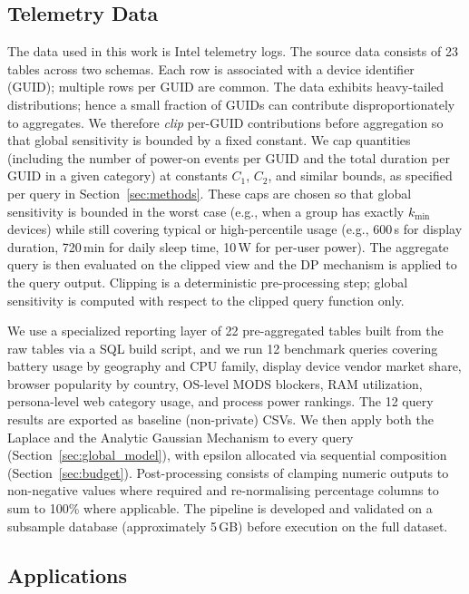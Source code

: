 \documentclass[12pt,letterpaper]{article}
\begin{document}
\subsection{Telemetry Data}
\label{sec:telemetry_data}

The data used in this work is Intel telemetry logs. The source data consists of 23 tables across two schemas. Each row is associated with a device identifier (GUID); multiple rows per GUID are common. The data exhibits heavy-tailed distributions; hence a small fraction of GUIDs can contribute disproportionately to aggregates. We therefore \emph{clip} per-GUID contributions before aggregation so that global sensitivity is bounded by a fixed constant. We cap quantities (including the number of power-on events per GUID and the total duration per GUID in a given category) at constants $C_1$, $C_2$, and similar bounds, as specified per query in Section~\ref{sec:methods}. These caps are chosen so that global sensitivity is bounded in the worst case (e.g., when a group has exactly $k_{\min}$ devices) while still covering typical or high-percentile usage (e.g., 600\,s for display duration, 720\,min for daily sleep time, 10\,W for per-user power). The aggregate query is then evaluated on the clipped view and the DP mechanism is applied to the query output. Clipping is a deterministic pre-processing step; global sensitivity is computed with respect to the clipped query function only.

We use a specialized reporting layer of 22 pre-aggregated tables built from the raw tables via a SQL build script, and we run 12 benchmark queries covering battery usage by geography and CPU family, display device vendor market share, browser popularity by country, OS-level MODS blockers, RAM utilization, persona-level web category usage, and process power rankings. The 12 query results are exported as baseline (non-private) CSVs. We then apply both the Laplace and the Analytic Gaussian Mechanism to every query (Section~\ref{sec:global_model}), with epsilon allocated via sequential composition (Section~\ref{sec:budget}). Post-processing consists of clamping numeric outputs to non-negative values where required and re-normalising percentage columns to sum to 100\% where applicable. The pipeline is developed and validated on a subsample database (approximately 5\,GB) before execution on the full dataset.

\subsection{Applications}
\label{sec:applications}
\end{document}

